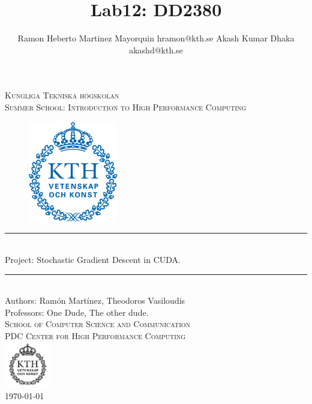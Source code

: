 \documentclass[11pt,a4paper]{article}
\title{Lab12: DD2380 }
\author{
Ramon Heberto Martinez Mayorquin  hramon@kth.se
Akash Kumar Dhaka  akashd@kth.se
}
\newcommand{\HRule}{\rule{\linewidth}{0.5mm}}
\begin{document}
\begin{titlepage}
\begin{center}

\textsc{\LARGE Kungliga Tekniska högskolan}\\[1.0cm]

\textsc{\Large Summer School: Introduction to High Performance Computing}\\[2.0cm]



\begin{figure}[H]
	\centering
 \includegraphics[width=0.35\textwidth]{Kth_logo.png}
\end{figure}
%

\HRule \\[0.4cm]
{ \huge  Project: Stochastic Gradient Descent in CUDA.
}\\[0.4cm]
\HRule \\[1.5cm]


Authors: Ram\'on  Mart\'inez, Theodoros Vasiloudis   \\
\large Professors: One Dude, The other dude.  \\ [2.5cm]

\textsc{\Large School of Computer Science and Communication \\
PDC Center for High Performance Computing}\\ [1.0cm]
\includegraphics[width=0.15\textwidth]{KTH_black.png}\\[1.5cm] %
{\large \today}

\end{center}
\end{titlepage}
\end{document}
